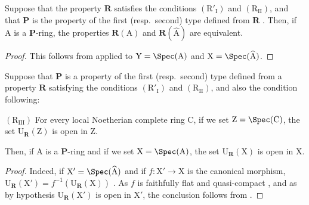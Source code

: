 \begin{proposition}[7.3.17]
\label{IV.7.3.17}
Suppose that the property $\boldsymbol{R}$ satisfies the conditions $(\mathrm{R}'_\mathrm{I})$ and $(\mathrm{R_{II}})$, and that $\boldsymbol{P}$ is the property of the first (resp.~second) type defined from $\boldsymbol{R}$ .
Then, if $\mathrm{A}$ is a $\boldsymbol{P}$-ring, the properties $\boldsymbol{R}(\mathrm{A})$ and $\boldsymbol{R}(\widehat{\mathrm{A}})$ are equivalent.
\end{proposition}

\begin{proof}
This follows from  applied to $\mathrm{Y}=\Spec(\mathrm{A})$ and $\mathrm{X}=\Spec(\widehat{\mathrm{A}})$.
\end{proof}

\begin{proposition}[7.3.18]
\label{IV.7.3.18}
Suppose that $\boldsymbol{P}$ is a property of the first (resp.~second) type defined from a property $\boldsymbol{R}$ satisfying the conditions $(\mathrm{R}'_\mathrm{I})$ and $(\mathrm{R_{II}})$, and also the condition following:

$(\mathrm{R_{III}})$ For every local Noetherian complete ring $\mathrm{C}$, if we set $\mathrm{Z}=\Spec(\mathrm{C})$, the set $\mathrm{U}_{\boldsymbol{R}}(\mathrm{Z})$  is open in $\mathrm{Z}$.

Then, if $\mathrm{A}$ is a $\boldsymbol{P}$-ring and if we set $\mathrm{X}=\Spec(\mathrm{A})$, the set $\mathrm{U}_{\boldsymbol{R}}(\mathrm{X})$ is open in $\mathrm{X}$.
\end{proposition}

\begin{proof}
Indeed, if $\mathrm{X}'=\Spec(\widehat{\mathrm{A}})$ and if $f:\mathrm{X}'\to\mathrm{X}$ is the canonical morphism, $\mathrm{U}_{\boldsymbol{R}}(\mathrm{X}')=f^{-1}(\mathrm{U}_{\boldsymbol{R}}(\mathrm{X}))$ .
As $f$ is faithfully flat and quasi-compact , and as by hypothesis $\mathrm{U}_{\boldsymbol{R}}(\mathrm{X}')$ is open in $\mathrm{X}'$, the conclusion follows from .
\end{proof}

